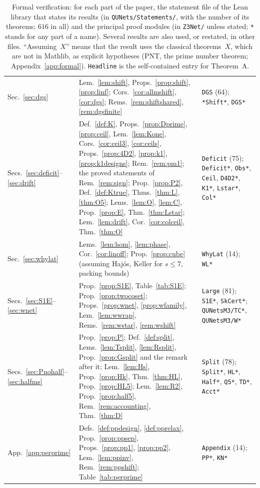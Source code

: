 \documentclass[11pt]{amsart}
\theoremstyle{definition}
\theoremstyle{plain}
\begin{document}
\begin{table}[tbp]
\begin{tabular}{@{}>{\raggedright\arraybackslash}p{2.0cm}>{\raggedright\arraybackslash}p{8.1cm}>{\raggedright\arraybackslash}p{4.5cm}@{}}
Sec.~\ref{sec:dgs} & Lem.~\ref{lem:shift}, Props.~\ref{prop:shift}, \ref{prop:linf}; Cors.~\ref{cor:allmshift}, \ref{cor:dgs}; Rems.~\ref{rem:shiftshared}, \ref{rem:dgsfinite} & \texttt{DGS} (64); \texttt{*Shift*}, \texttt{DGS*}\\
Secs.~\ref{sec:deficit}--\ref{sec:drift} & Def.~\ref{def:K}, Props.~\ref{prop:Dprime}, \ref{prop:ceil}, Lem.~\ref{lem:Kone}, Cors.~\ref{cor:ceil3}, \ref{cor:ceils}, Props.~\ref{prop:4D2}, \ref{prop:k1}, \ref{prop:k1designs}; Rem.~\ref{rem:pm1}; the proved statements of Rem.~\ref{rem:sign}; Prop.~\ref{prop:P2}, Def.~\ref{def:Ktrue}, Thms.~\ref{thm:L}, \ref{thm:O5}; Lems.~\ref{lem:O}, \ref{lem:C}, Prop.~\ref{prop:E}, Thm.~\ref{thm:Lstar}; Lem.~\ref{lem:drift}, Cor.~\ref{cor:colceil}, Thm.~\ref{thm:O} & \texttt{Deficit} (75); \texttt{Deficit*}, \texttt{Obs*}, \texttt{Ceil}, \texttt{D4D2*}, \texttt{K1*}, \texttt{Lstar*}, \texttt{Col*}\\
Sec.~\ref{sec:whylat} & Lems.~\ref{lem:hom}, \ref{lem:phase}, Cor.~\ref{cor:linoff}; Prop.~\ref{prop:cube} (assuming Haj\'os, Keller for $s\le7$, packing bounds) & \texttt{WhyLat} (14); \texttt{WL*}\\
Secs.~\ref{sec:S1E}--\ref{sec:wnet} & Prop.~\ref{prop:S1E}, Table~\ref{tab:S1E}; Prop.~\ref{prop:twocoset}; Props.~\ref{prop:wnet}, \ref{prop:wfamily}, Lem.~\ref{lem:wwrap}, Rems.~\ref{rem:wstar}, \ref{rem:wshift} & \texttt{Large} (81); \texttt{S1E*}, \texttt{SkCert*}; \texttt{QUNetsM3/TC*}, \texttt{QUNetsM3/W*}\\
Secs.~\ref{sec:Pnohalf}--\ref{sec:halfms} & Prop.~\ref{prop:P}; Def.~\ref{def:split}, Lems.~\ref{lem:Tsplit}, \ref{lem:Rsplit}, Prop.~\ref{prop:Gsplit} and the remark after it; Lem.~\ref{lem:Hs}, Prop.~\ref{prop:Hk}, Thm.~\ref{thm:HL}, Prop.~\ref{prop:HL5}; Lem.~\ref{lem:R2}, Prop.~\ref{prop:half5}, Rem.~\ref{rem:accounting}, Thm.~\ref{thm:D} & \texttt{Split} (78); \texttt{Split*}, \texttt{HL*}, \texttt{Half*}, \texttt{Q5*}, \texttt{TD*}, \texttt{Acct*}\\
App.~\ref{app:perprime} & Defs.~\ref{def:ppdesign}, \ref{def:pprelax}, Prop.~\ref{prop:ppsep}, Props.~\ref{prop:pp1}, \ref{prop:pp2}, Lem.~\ref{lem:ppinv}, Rem.~\ref{rem:ppshift}; Table~\ref{tab:perprime} & \texttt{Appendix} (14); \texttt{PP*}, \texttt{KN*}\\
\bottomrule
\end{tabular}
\medskip
\caption{Formal verification: for each part of the paper, the statement file of the Lean library that states its results (in \texttt{QUNets/Statements/}, with the number of its theorems; $616$ in all) and the principal proof modules (in \texttt{Z3Net/} unless stated; \texttt{*} stands for any part of a name). Several results are also used, or restated, in other files. ``Assuming~$X$'' means that the result uses the classical theorems~$X$, which are not in Mathlib, as explicit hypotheses (PNT, the prime number theorem; Appendix~\ref{app:formal}). \texttt{Headline} is the self-contained entry for Theorem~A.}
\label{tab:lean}
\end{table}
\end{document}
